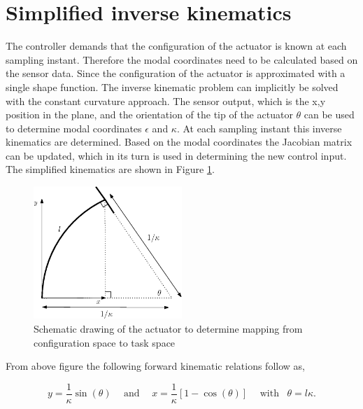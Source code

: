 \label{app4}





\section{Simplified inverse kinematics}

The controller demands that the configuration of the actuator is known at each sampling instant. Therefore the modal coordinates need to be calculated based on the sensor data. Since the configuration of the actuator is approximated with a single shape function. The inverse kinematic problem can implicitly be solved with the constant curvature approach. The sensor output, which is the x,y position in the plane, and the orientation of the tip of the actuator $\theta$ can be used to determine modal coordinates $\epsilon$ and $\kappa$. At each sampling instant this inverse kinematics are determined. Based on the modal coordinates the Jacobian matrix can be updated, which in its turn is used in determining the new control input. The simplified kinematics are shown in Figure \ref{fig:simpkin}.

\begin{figure}[H]
    \centering
    \includegraphics[width = 0.5\textwidth]{Figures/Chapter5/fbdkinematics.eps}
    \caption{Schematic drawing of the actuator to determine mapping from configuration space to task space}
    \label{fig:simpkin}
\end{figure}

From above figure the following forward kinematic relations follow as,


\begin{equation}
    y = \frac{1}{\kappa}\sin(\theta) \hspace{15pt} \text{and} \hspace{15pt}    x = \frac{1}{\kappa}[1-\cos(\theta)] \hspace{15pt} \text{with} \hspace{10pt}   \theta = l \kappa.
\end{equation}

